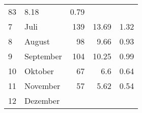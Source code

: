 \begin{longtable}{lXrrr}
       \num{83} &
       \num[round-mode=places,round-precision=2]{8.18} &
         \num[round-mode=places,round-precision=2]{0.79} \\

     7 &
     \multicolumn{1}{X}{ Juli   } &


       \num{139} &
       \num[round-mode=places,round-precision=2]{13.69} &
         \num[round-mode=places,round-precision=2]{1.32} \\

     8 &
     \multicolumn{1}{X}{ August   } &


       \num{98} &
       \num[round-mode=places,round-precision=2]{9.66} &
         \num[round-mode=places,round-precision=2]{0.93} \\

     9 &
     \multicolumn{1}{X}{ September   } &


       \num{104} &
       \num[round-mode=places,round-precision=2]{10.25} &
         \num[round-mode=places,round-precision=2]{0.99} \\

     10 &
     \multicolumn{1}{X}{ Oktober   } &


       \num{67} &
       \num[round-mode=places,round-precision=2]{6.6} &
         \num[round-mode=places,round-precision=2]{0.64} \\

     11 &
     \multicolumn{1}{X}{ November   } &


       \num{57} &
       \num[round-mode=places,round-precision=2]{5.62} &
         \num[round-mode=places,round-precision=2]{0.54} \\

     12 &
     \multicolumn{1}{X}{ Dezember   } &



\end{longtable}
